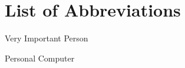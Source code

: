 \section{List of Abbreviations}

\begin{description}[leftmargin=!,labelwidth=2cm]
    \item [VIP] Very Important Person
    \item [PC] Personal Computer

\end{description}